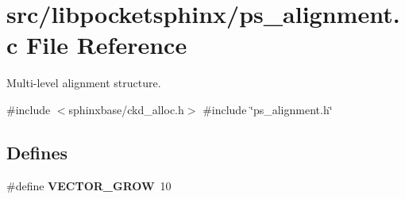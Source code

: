 \section{src/libpocketsphinx/ps\-\_\-alignment.c \-File \-Reference}
\label{ps__alignment_8c}


\-Multi-\/level alignment structure.  


{\ttfamily \#include $<$sphinxbase/ckd\-\_\-alloc.\-h$>$}\*
{\ttfamily \#include \char`\"{}ps\-\_\-alignment.\-h\char`\"{}}\*
\subsection*{\-Defines}
\begin{DoxyCompactItemize}
\item 
\#define {\bfseries \-V\-E\-C\-T\-O\-R\-\_\-\-G\-R\-O\-W}~10\label{ps__alignment_8c_af4a1705d5cc1103ccf95a9b5401d4c6e}

\end{DoxyCompactItemize}
